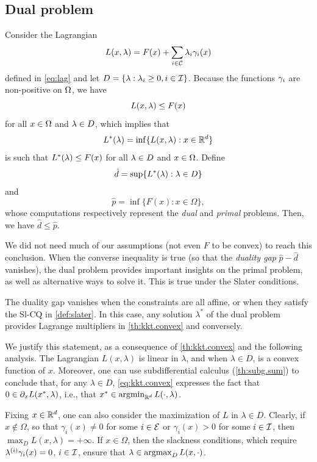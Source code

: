 \subsection{Dual problem}
Consider the Lagrangian 
\[
L(x, \lambda) = F(x) + \sum_{i\in {\mathcal C}} \lambda_i \gamma_i(x)
\]
defined in \cref{eq:lag} and let $D = \{\lambda: \lambda_i\geq 0, i\in {\mathcal I}\}$. Because the functions $\gamma_i$ are non-positive on $\Omega$, we have
\[
L(x, \lambda) \leq F(x)
\]
for all $x\in \Omega$ and $\lambda\in D$, which implies that
\[
L^*(\lambda) = \inf \{L(x,\lambda): x\in {\mathbb{R}}^d\}
\]
is such that $L^*(\lambda) \leq F(x)$ for all $\lambda\in D$ and $x\in \Omega$. Define 
\[
\hat d = \sup \{L^*(\lambda): \lambda\in D\}
\]
and
\[
\hat p = \inf \{F(x): x\in \Omega\},
\] 
whose computations respectively represent the {\em dual} and {\em primal} problems. Then, we have $\hat d \leq \hat p$.

We did not need much of our assumptions (not even $F$ to be convex) to reach this conclusion. When the converse inequality is true (so that the {\em duality gap} $\hat p - \hat d$ vanishes),  the dual problem provides important insights on the primal problem, as well as alternative ways to solve it. This is true under the Slater conditions.

\begin{theorem}
\label{th:slater}
The duality gap vanishes when the constraints are all affine, or when they satisfy the Sl-CQ in \cref{def:slater}. In this case, any solution $\lambda^*$ of the dual problem provides Lagrange multipliers in \cref{th:kkt.convex} and conversely. 
\end{theorem}

We justify this statement, as a consequence of \cref{th:kkt.convex} and the following analysis. The Lagrangian
$L(x, \lambda)$ is linear in $\lambda$, and when $\lambda \in D$, is a convex function of $x$. Moreover, one can use subdifferential calculus (\cref{th:subg.sum}) to conclude that, for any $\lambda\in D$, \cref{eq:kkt.convex} expresses the fact that $0\in \partial_x L(x^*, \lambda)$, i.e., that $x^* \in \operatorname*{argmin}_{{\mathbb{R}}^d} L(\cdot, \lambda)$.

Fixing $x\in {\mathbb{R}}^d$, one can also consider the maximization of $L$ in $\lambda\in D$. Clearly, if $x\not \in \Omega$, so that $\gamma_i(x) \neq 0$ for some $i\in {\mathcal E}$ or $\gamma_i(x) > 0$ for some $i\in {\mathcal I}$, then $\max_D L(x, \lambda) = +\infty$. If $x\in \Omega$, then the slackness conditions, which require $\lambda^{(i)} \gamma_i(x)=0$, $i\in {\mathcal I}$, ensure that $\lambda \in \operatorname*{argmax}_D L(x,\cdot)$. 

